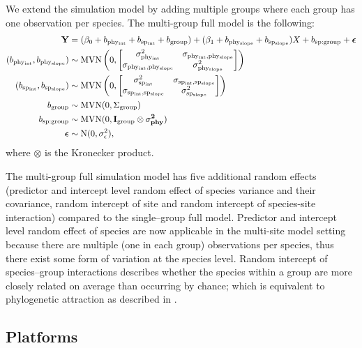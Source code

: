 \documentclass[12pt]{article}
\begin{document}
We extend the simulation model by adding multiple groups where each group has one observation per species. The multi-group full model is the following: 
\begin{align}
{\mathbf Y} & = (\beta_0 + b_{\mathrm{phy_{int}}} + b_{\mathrm{sp_{int}}} + b_{\mathrm{group}}) + (\beta_1 + b_{\mathrm{phy_{slope}}} + b_{\mathrm{sp_{slope}}}) X + b_{\mathrm{sp:group}} + {\boldsymbol \epsilon} \label{eq:ms_sim}\\
(b_{\mathrm{phy_{int}}}, b_{\mathrm{phy_{slope}}}) & \sim \textrm{MVN} \left( 0, \begin{bmatrix}
\sigma^2_{\mathrm{phy_{int}}} & \sigma_{\mathrm{phy_{int},phy_{slope}}} \\ 
\sigma_{\mathrm{phy_{int},phy_{slope}}} & \sigma^2_{\mathrm{phy_{slope}}}
\end{bmatrix}
\right) \\
(b_{\mathrm{sp_{int}}}, b_{\mathrm{sp_{slope}}}) & \sim \textrm{MVN} \left( 0, \begin{bmatrix}
\sigma^2_{\mathrm{sp_{int}}} & \sigma_{\mathrm{sp_{int},sp_{slope}}} \\ 
\sigma_{\mathrm{sp_{int},sp_{slope}}} & \sigma^2_{\mathrm{sp_{slope}}}
\end{bmatrix}
\right) \\
b_{\mathrm{group}} & \sim \textrm{MVN} ( 0 , \Sigma_{\mathrm{group}}) \\
b_{\mathrm{sp:group}} & \sim \textrm{MVN} (0, \bf{I}_{\mathrm{group}} \otimes \sigma^2_{phy}) \\
{\boldsymbol \epsilon} & \sim \textrm{N} ( 0 , \sigma_{\epsilon}^2),
\end{align}
where $\otimes$ is the Kronecker product.

The multi-group full simulation model has five additional random effects (predictor and intercept level random effect of species variance and their covariance, random intercept of site and random intercept of species-site interaction) compared to the single--group full model.
Predictor and intercept level random effect of species are now applicable in the multi-site model setting because there are multiple (one in each group) observations per species, thus there exist some form of variation at the species level.
Random intercept of species--group interactions describes whether the species within a group are more closely related on average than occurring by chance; which is equivalent to phylogenetic attraction as described in \cite{helmus2007separating}. 

\subsection*{Platforms}
\end{document}
